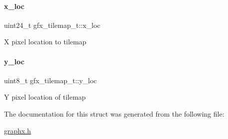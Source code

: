 \paragraph{\texorpdfstring{x\+\_\+loc}{x\_loc}}
{\footnotesize\ttfamily uint24\+\_\+t gfx\+\_\+tilemap\+\_\+t\+::x\+\_\+loc}

X pixel location to tilemap \mbox{\label{structgfx__tilemap__t_a136405fb3ced986880fbc44a8484e27b}} 
\paragraph{\texorpdfstring{y\+\_\+loc}{y\_loc}}
{\footnotesize\ttfamily uint8\+\_\+t gfx\+\_\+tilemap\+\_\+t\+::y\+\_\+loc}

Y pixel location of tilemap 

The documentation for this struct was generated from the following file\+:\begin{DoxyCompactItemize}
\item 
\hyperlink{graphx_8h}{graphx.\+h}\end{DoxyCompactItemize}
